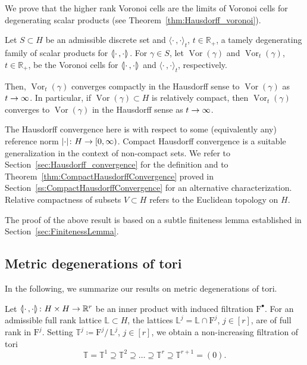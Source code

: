 \documentclass[AHL,Unicode,longabstracts]{cedram}
\newcommand{\innone}[2]{{\langle#2\rangle_{#1}}}
\newcommand{\llangle}{\mathopen{\langle\mkern -3.1mu\lvert}}
\newcommand{\rrangle}{\mathclose{\rvert\mkern -3.1mu\rangle}}
\newcommand{\highinn}[2]{{\llangle#2\rrangle_{#1}}}
\newcommand{\refnorm}[1]{\lvert#1\rvert}
\newcommand{\rquot}[2]{#1/\,#2}
\DeclareMathOperator{\Vor}{Vor}
\newcommand{\filter}{\mathrm{F}}
\newcommand{\R}{\mathbb{R}}
\newcommand{\T}{\mathbb{T}}
\renewcommand{\L}{\mathbb{L}}
\renewcommand*{\to}{\mathchoice{\longrightarrow}{\rightarrow}{\rightarrow}{\rightarrow}}
\begin{document}
We prove that the higher rank Voronoi cells are the limits of Voronoi cells for degenerating scalar products (see Theorem~\ref{thm:Hausdorff_voronoi}).

\begin{theo}\label{thm:Hausdorff_voronoi_Intro}
Let $S \subset H$ be an admissible discrete set and $\innone{t}{\cdot\,, \cdot}$, $t \in \R_+$, a tamely degenerating family of scalar products for $\highinn{}{\cdot\,, \cdot}$.
For $\gamma \in S$, let $\Vor(\gamma)$ and $\Vor_t(\gamma)$, $t \in \R_+$, be the Voronoi cells for $\highinn{}{\cdot\,, \cdot}$ and $\innone{t}{\cdot\,, \cdot}$, respectively.

Then, $\Vor_t(\gamma)$ converges compactly in the Hausdorff sense to $\Vor(\gamma)$ as $t \to \infty$. In particular, if $\Vor (\gamma) \subset H$ is relatively compact, then $\Vor_t(\gamma)$ converges to $\Vor(\gamma)$ in the Hausdorff sense as $t \to \infty$.
\end{theo}

The Hausdorff convergence here is with respect to some (equivalently any) reference norm $\refnorm{\cdot} \colon H \to [0, \infty)$. Compact Hausdorff convergence is a suitable generalization in the context of non-compact sets. We refer to Section~\ref{sec:Hausdorff_convergence} for the definition and to Theorem~\ref{thm:CompactHausdorffConvergence} proved in Section~\ref{ss:CompactHausdorffConvergence} for an alternative characterization. Relative compactness of subsets $V\subset H$ refers to the Euclidean topology on $H$.


The proof of the above result is based on a subtle finiteness lemma established in Section~\ref{sec:FinitenessLemma}.


\subsection{Metric degenerations of tori}

In the following, we summarize our results on metric degenerations of tori.

Let $\highinn{}{\cdot \,, \cdot} \colon H \times H \to \R^r$ be an inner product with induced filtration $\filter^\bullet$. For an admissible full rank lattice $\L \subset H$, the lattices $\L^j = \L \cap \filter^j$, $j \in [r]$, are of full rank in $\filter^j$. Setting $\T^j \coloneqq
\rquot{\filter^j}{\L^j}$, $j\in [r]$, we obtain a non-increasing filtration of tori
\[
\T= \T^1\supseteq \T^2 \supseteq \dots \supseteq \T^r\supseteq \T^{r+1}=(0).
\]
\end{document}
